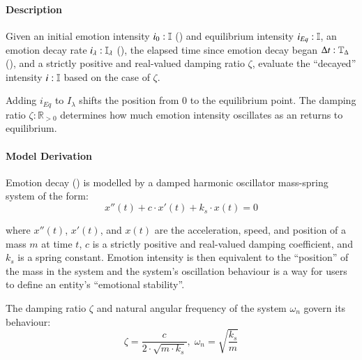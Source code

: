 \paragraph{Description} Given an initial emotion intensity $i_0 :
\mathbb{I}$ () and equilibrium intensity
$i_{Eq} : \mathbb{I}$, an emotion decay rate $i_\lambda :
\mathbb{I_{\lambda}}$ (), the elapsed time since emotion
decay began $\Delta t : \mathbb{T}_{\Delta}$ (), and a strictly
positive and real-valued damping ratio $\zeta$, evaluate the ``decayed''
intensity $i : \mathbb{I}$ based on the case of $\zeta$.

Adding $i_{Eq}$ to $I_\lambda$ shifts the position from 0 to the equilibrium
point. The damping ratio $\zeta : \mathbb{R}_{>0}$ determines how much emotion
intensity oscillates as an returns to equilibrium.

\paragraph{Model Derivation} Emotion decay () is
modelled by a damped harmonic oscillator mass-spring system of the form:
$$x''\left(t\right) + c \cdot x'\left(t\right) + k_s \cdot x\left(t\right) = 0$$

where $x''\left(t\right)$, $x'\left(t\right)$, and $x\left(t\right)$ are the
acceleration, speed, and position of a mass $m$ at time $t$, $c$ is a strictly
positive and real-valued damping coefficient, and $k_s$ is a spring constant.
Emotion intensity is then equivalent to the ``position'' of the mass in the
system and the system's oscillation behaviour is a way for users to define an
entity's ``emotional stability''.

The damping ratio $\zeta$ and natural angular frequency of the system
$\omega_n$ govern its behaviour:
$$\zeta = \dfrac{c}{2 \cdot \sqrt{m \cdot k_s}}, \; \omega_n =
\sqrt{\dfrac{k_s}{m}}$$

